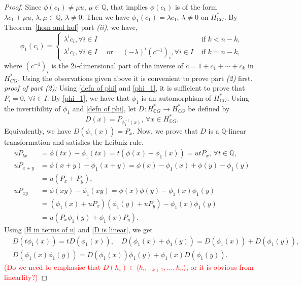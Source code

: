 \documentclass{amsart}
\newcommand{\thmref}[1]{Theorem~\ref{#1}}
\begin{document}
\begin{proof}
		
		
		Since $\phi(c_1)\neq \mu u, \, \mu \in \mathbb{Q}$, that implies $\phi(c_1)$ is of the form $\lambda c_1+\mu u,\, \lambda,\mu \in \mathbb{Q}, \, \lambda \neq 0$. Then we have $\phi_1(c_1) = \lambda c_1,\, \lambda\neq 0$ on $H^*_{\mathbb{C}G}$.  By \thmref{hom and hof} part \textit{(ii)}, we have, 
		\begin{equation}\label{phi_1}
			\phi_1(c_i) = \begin{cases}
				\lambda^i c_i,   \forall i \in I& \text{ if } k<n-k,\\
				\lambda^i c_i,  \forall i \in I \quad \text{ or } \quad(-\lambda)^i (c^{-1})_i,    \forall i \in I & \text{ if } k= n-k,
			\end{cases}
		\end{equation} where $ (c^{-1})_i $ is the $ 2i $-dimensional part of the inverse of $ c = 1 + c_1 + \cdots + c_k $ in $ H^*_{ CG} $. Using the observations given above it is convenient to prove part \textit{(2)} first. \\
		
		
		\textit{proof of part (2):} Using \eqref{defn of phi} and \eqref{phi_1}, it is sufficient to prove that $P_i =0, \, \forall i \in I$. By \eqref{phi_1}, we have that $\phi_1$ is an automorphism of $H^*_{\mathbb CG}$. Using the invertibility of $\phi_1$ and \eqref{defn of phi}, let $D: H^*_{\mathbb{C}G} \rightarrow H^*_{\mathbb{C}G}$ be defined by $$D(x) = P_{\phi_1^{-1}(x)},\, \forall x \in H^*_{\mathbb{C}G}.$$
		Equivalently, we have $D(\phi_1(x)) = P_x$. Now, we prove that $D$ is a $\mathbb Q$-linear transformation and satisfies the Leibniz rule.
		\begin{equation}\label{D is linear}
			\begin{split}
				uP_{tx} &= \phi(tx) - \phi_1(tx) = t(\phi(x) - \phi_1(x)) = utP_{x},\, \forall t \in \mathbb{Q},\\
				uP_{x + y} &= \phi(x+y) - \phi_1(x+y) = \phi(x) - \phi_1(x)+ \phi(y) - \phi_1(y)\\ &= u(P_{x}+P_{y}),\\
				uP_{x y} &= \phi(x y) - \phi_1(xy) = \phi(x)\phi(y)-\phi_1(x)\phi_1(y) \\
				&= (\phi_1(x)+uP_{x})(\phi_1(y)+uP_y)- \phi_1(x)\phi_1(y)\\
				&= u(P_x\phi_1(y)+\phi_1(x)P_y).
			\end{split}
		\end{equation}
		Using \eqref{H in terms of u} and \eqref{D is linear}, we get  \begin{align*}
			& D(t\phi_1(x)) = tD(\phi_1(x)),\quad D(\phi_1(x)+\phi_1(y)) = D(\phi_1(x))+D(\phi_1(y)),\\
			&D(\phi_1(x)\phi_1(y)) = D(\phi_1(x))\phi_1(y)+\phi_1(x)D(\phi_1(y)).
		\end{align*}
		\iffalse \textcolor{red}{(Do we need to emphasise that $D(h_i)\in \langle h_{n-k+1},\ldots,h_n\rangle$, or it is obvious from linearlity?)}
		

\end{proof}
\end{document}
